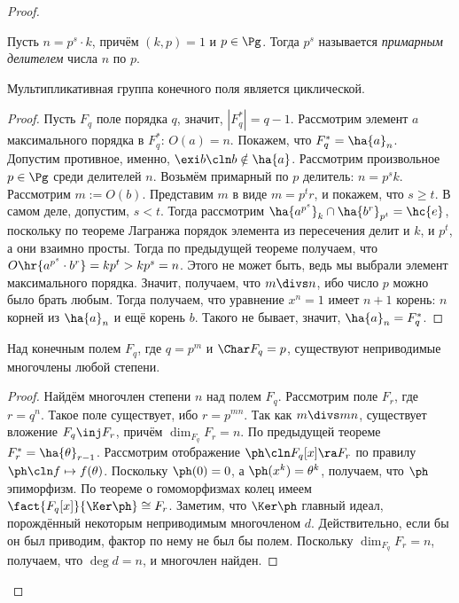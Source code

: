 \documentclass[a4paper]{article}
\newcommand{\kph}{\Ker \ph}
\begin{document}
\begin{proof}
\begin{df}
Пусть $n=p^s \cdot k$, причём $(k,p)=1$ и $p \in \Pg$. Тогда $p^s$  называется \emph{примарным делителем}
числа $n$ по $p$.
\end{df}

\begin{theorem}
Мультипликативная группа конечного поля является циклической.
\end{theorem}
\begin{proof}
Пусть $F_q$ поле порядка $q$, значит, $|F_q^*|=q-1$. Рассмотрим  элемент $a$ максимального порядка в
$F_q^*$: $O(a)=n$. Покажем, что $F_q^*=\ha{a}_n$. Допустим противное, именно, $\exi b\cln b \notin \ha{a}$.
Рассмотрим произвольное $p \in \Pg$ среди делителей $n$. Возьмём примарный по $p$ делитель: $n=p^sk$.
Рассмотрим $m := O(b)$. Представим $m$ в виде $m=p^tr$, и покажем, что $s \ge t$. В самом деле, допустим, $s
< t$. Тогда рассмотрим $\ha{a^{p^s}}_k\cap\ha{b^r}_{p^t}=\hc{e}$, поскольку по теореме Лагранжа порядок
элемента из пересечения делит и $k$, и $p^t$, а они взаимно просты. Тогда по предыдущей теореме получаем, что
$O\hr{a^{p^s}\cdot b^r}=kp^t>kp^s=n$. Этого не может быть, ведь мы выбрали элемент максимального порядка.
Значит, получаем, что $m \divs n$, ибо число $p$ можно было брать любым. Тогда получаем, что уравнение
$x^n=1$ имеет $n+1$ корень: $n$ корней из $\ha{a}_n$ и ещё корень $b$. Такого не бывает, значит,
$\ha{a}_n=F_q^*$.
\end{proof}

\begin{theorem}
Над конечным полем $F_q$, где $q = p^m$ и $\Char F_q = p$, существуют неприводимые многочлены любой степени.
\end{theorem}
\begin{proof}
Найдём многочлен степени $n$ над полем $F_q$. Рассмотрим поле $F_r$,  где $r = q^n$. Такое поле существует,
ибо $r = p^{mn}$. Так как $m \divs mn$, существует вложение $F_q \inj F_r$, причём $\dim_{F_q} F_r=n$. По
предыдущей теореме $F^*_r=\ha{\theta}_{r-1}$. Рассмотрим отображение $\ph\cln F_q[x] \ra F_r$ по правилу $\ph\cln f
\mapsto f(\theta)$. Поскольку $\ph(0) = 0$, а $\ph(x^k) = \theta^k$, получаем, что $\ph$ эпиморфизм. По
теореме о гомоморфизмах колец имеем $\fact{F_q[x]}{\kph} \cong F_r$. Заметим, что $\kph$ главный идеал,
порождённый некоторым неприводимым многочленом $d$. Действительно, если бы он был приводим, фактор по нему не
был бы полем. Поскольку $\dim_{F_q} F_r = n$, получаем, что $\deg d = n$, и многочлен найден.
\end{proof}


\end{proof}
\end{document}
